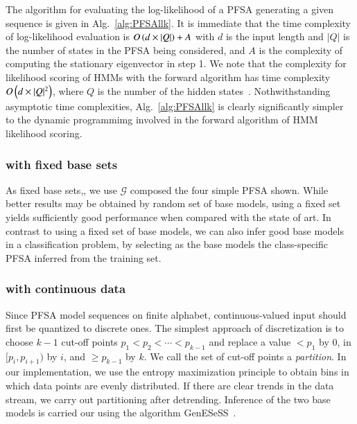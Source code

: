 \documentclass[9pt,journal,compsoc]{IEEEtran}
\begin{document}
{   The algorithm for evaluating the log-likelihood of a PFSA generating a given sequence is given in Alg.~\ref{alg:PFSAllk}.    It is immediate that the time complexity of log-likelihood evaluation is  $O\left( d\times|Q| \right)+A$ with $d$ is the input length   and $|Q|$ is the number of states in the PFSA being considered, and $A$ is the complexity of computing the stationary eigenvector in step 1.	We note that the complexity for likelihood scoring of HMMs with the forward algorithm  has time complexity $O\left( d\times|Q|^2 \right)$, where $Q$ is the number of the hidden states~\cite{rabiner1989tutorial}. Nothwithstanding asymptotic time complexities, Alg.~\ref{alg:PFSAllk} is clearly significantly simpler to the dynamic programmimg involved in the forward algorithm of HMM likelihood scoring.
 
 \subsubsection{\ALGONAME with fixed base sets}
As fixed base sets,,  we use $\mathcal{G}$ composed the four simple PFSA shown. While better results may be obtained by random set of base models, using a fixed set yields sufficiently good performance when compared with the state of art.  In contrast  to using a fixed set of base models, we can also infer good base models in a classification problem, by selecting as the base models the class-specific PFSA inferred from the training set. %
   \subsubsection{\ALGONAME with continuous data}
   Since PFSA model sequences on finite alphabet, continuous-valued input should first be quantized to discrete ones. The simplest approach of discretization is to choose $k-1$ cut-off points $p_1 < p_2 < \cdots <p_{k-1}$ and replace a value $<p_1$ by $0$, in $[p_i, p_{i+1})$ by $i$, and $\geq p_{k-1}$ by $k$. We call the set of cut-off points a \emph{partition}. In our implementation, we use the  entropy maximization principle  to obtain bins in which data points are evenly distributed. If there are clear trends in the data stream, we carry out partitioning after detrending. Inference of the two base models is carried our  using the algorithm \textsf{GenESeSS}~\cite{chattopadhyay2013abductive}.

}
\end{document}
